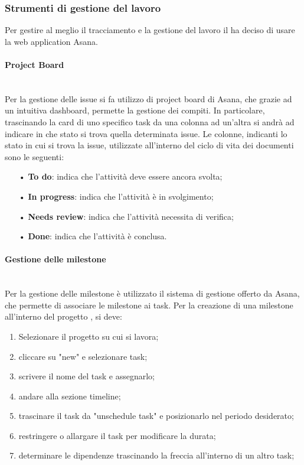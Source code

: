     \subsubsection{Strumenti di gestione del lavoro}\mbox{}
    Per gestire al meglio il tracciamento e la gestione del lavoro il \Gruppo \space ha deciso di usare la web application Asana. 

    \paragraph{Project Board}\mbox{}\\
    \label{sec:projectboard}
    Per la gestione delle {issue} si fa utilizzo di {project board} di Asana, che grazie ad un intuitiva dashboard, permette
    la gestione dei compiti. In particolare, trascinando la {card} di uno specifico task da una colonna ad un'altra si andrà ad 
    indicare in che stato si trova quella determinata issue.
    Le colonne, indicanti lo stato in cui si trova la issue, utilizzate all'interno del ciclo di vita dei 
    documenti sono le seguenti:
    \begin{itemize}
    \item[•] \textbf{To do}: indica che l'attività deve essere ancora svolta;
    \item[•] \textbf{In progress}: indica che l'attività è in svolgimento;
    \item[•] \textbf{Needs review}: indica che l'attività necessita di verifica;
    \item[•] \textbf{Done}: indica che l'attività è conclusa.
    \end{itemize}

    \paragraph{Gestione delle milestone}\mbox{}\\
    Per la gestione delle {milestone} è utilizzato il sistema di gestione offerto da Asana, che permette di associare le 
    milestone ai task.
    Per la creazione di una milestone all'interno del progetto \NomeProgetto, si deve:
    \begin{enumerate}
    \item Selezionare il progetto su cui si lavora;
    \item cliccare su "new" e selezionare task;
    \item scrivere il nome del task e assegnarlo;
    \item andare alla sezione timeline;
    \item trascinare il task da "unschedule task" e posizionarlo nel periodo desiderato;
    \item restringere o allargare il task per modificare la durata; 
    \item determinare le dipendenze trascinando la freccia all'interno di un altro task;
    \end{enumerate}

